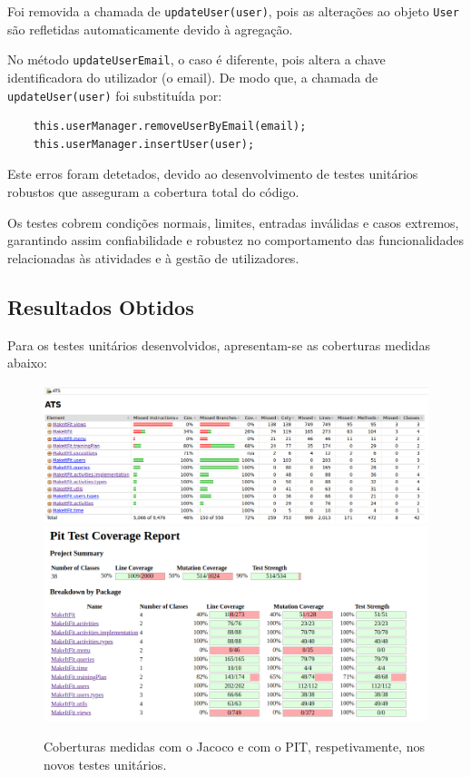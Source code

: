 \documentclass[12pt, a4paper]{article}
\begin{document}
Foi removida a chamada de \texttt{updateUser(user)}, pois as alterações ao objeto \texttt{User} são
refletidas automaticamente devido à agregação.

No método \texttt{updateUserEmail}, o caso é diferente, pois altera a chave identificadora do
utilizador (o email). De modo que, a chamada de \texttt{updateUser(user)} foi substituída por:
\begin{verbatim}
    this.userManager.removeUserByEmail(email);
    this.userManager.insertUser(user);
\end{verbatim}

Este erros foram detetados, devido ao desenvolvimento de testes unitários robustos que asseguram a
cobertura total do código.

Os testes cobrem condições normais, limites, entradas inválidas e casos extremos, garantindo assim
confiabilidade e robustez no comportamento das funcionalidades relacionadas às atividades e à gestão
de utilizadores.

\subsection{Resultados Obtidos}

Para os testes unitários desenvolvidos, apresentam-se as coberturas medidas abaixo:

\begin{figure}[H]
    \includegraphics[width=\textwidth]{res/Jacoco.png}
    \includegraphics[width=\textwidth]{res/Pit.png}
    \caption{Coberturas medidas com o Jacoco e com o PIT, respetivamente, nos novos testes unitários.}
\end{figure}
\end{document}

